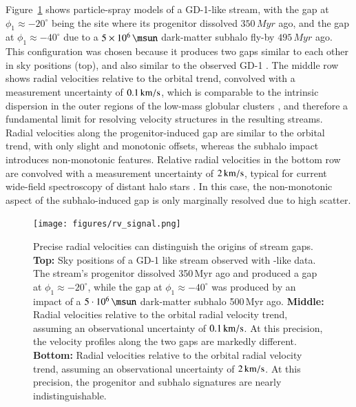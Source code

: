 \documentclass[final,5p,times,twocolumn,authoryear]{elsarticle}
\begin{document}
Figure~\ref{fig:rv_signal} shows particle-spray models of a GD-1-like stream, with the gap at $\phi_1\approx-20^\circ$ being the site where its progenitor dissolved $350\,\unit{Myr}$ ago, and the gap at $\phi_1\approx-40^\circ$ due to a $5\times10^6\,\unit{\msun}$ dark-matter subhalo fly-by $495\,\unit{Myr}$ ago.
This configuration was chosen because it produces two gaps similar to each other in sky positions (top), and also similar to the observed GD-1 \citep[e.g.,][]{price-whelan:2018}.
The middle row shows radial velocities relative to the orbital trend, convolved with a measurement uncertainty of $0.1\,\unit{\kms}$, which is comparable to the intrinsic dispersion in the outer regions of the low-mass globular clusters \citep{baumgardt:2019}, and therefore a fundamental limit for resolving velocity structures in the resulting streams.
Radial velocities along the progenitor-induced gap are similar to the orbital trend, with only slight and monotonic offsets, whereas the subhalo impact introduces non-monotonic features.
Relative radial velocities in the bottom row are convolved with a measurement uncertainty of $2\,\unit{\kms}$, typical for current wide-field spectroscopy of distant halo stars \citep[e.g.,][]{li:2019, cooper:2023}.
In this case, the non-monotonic aspect of the subhalo-induced gap is only marginally resolved due to high scatter.

\begin{figure}[t!]
\begin{center}
\texttt{[image: figures/rv\_signal.png]}
\end{center}
\caption{%
Precise radial velocities can distinguish the origins of stream gaps.
\textbf{Top:} Sky positions of a GD-1 like stream observed with \gaia-like data.
The stream's progenitor dissolved 350\,Myr ago and produced a gap at $\phi_1\approx-20^\circ$, while the gap at $\phi_1\approx-40^\circ$ was produced by an impact of a $5\cdot10^6\,\unit{\msun}$ dark-matter subhalo 500\,Myr ago.
\textbf{Middle:} Radial velocities relative to the orbital radial velocity trend, assuming an observational uncertainty of $0.1\,\unit{\kms}$.
At this precision, the velocity profiles along the two gaps are markedly different.
\textbf{Bottom:} Radial velocities relative to the orbital radial velocity trend, assuming an observational uncertainty of $2\,\unit{\kms}$.
At this precision, the progenitor and subhalo signatures are nearly indistinguishable.
}
\label{fig:rv_signal}
\end{figure}
\end{document}
